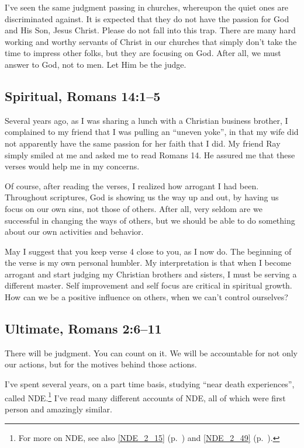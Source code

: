 \documentclass[12pt]{memoir}
\begin{document}
I've seen the same judgment passing in churches, whereupon the
quiet ones are discriminated against.
It is expected that they do
not have the passion for God and His Son, Jesus Christ. Please do
not fall into this trap. There are many hard working and worthy
servants of Christ in our churches that simply don't take the time
to impress other folks, but they are focusing on God. After all, we
must answer to God, not to men. Let Him be the judge.


\subsection[Spiritual]{Spiritual, Romans 14:1--5}

Several years ago, as I was sharing a lunch with a Christian business brother, I complained to my friend that I was pulling an ``uneven yoke'', in that my wife did not apparently have the same passion for her faith that I did. My friend Ray simply smiled at me and asked me to read Romans 14. He assured me that these verses would help me in my concerns. 

Of course, after reading the verses, I realized how arrogant I had
been. Throughout scriptures, God is showing us the way up and out,
by having us focus on our own sins, not those of others. After all,
very seldom are we successful in changing the ways of others, but
we should be able to do something about our own activities and behavior. 

May I suggest that you keep verse 4 close to you, as I now do. The
beginning of the verse is my own personal humbler. My interpretation is that when I become arrogant and start judging my
Christian brothers and sisters, I must be serving a different master.
Self improvement and self focus are critical in spiritual growth.
How can we be a positive influence on others, when we can't control
ourselves?

\subsection[Ultimate]{Ultimate, Romans 2:6--11}

There will be judgment. You can count on it. We will be accountable
for not only our actions, but for the motives behind those actions. 

\label{NDE_2_46}I've spent several years, on a part time basis, studying ``near death experiences'', called NDE.\footnote{For more on NDE, see also \ref{NDE_2_15} (p.\ \pageref{NDE_2_15}) and \ref{NDE_2_49} (p.\ \pageref{NDE_2_49}).} I've read many different accounts of NDE, all of which were first person and amazingly similar. 
\end{document}
